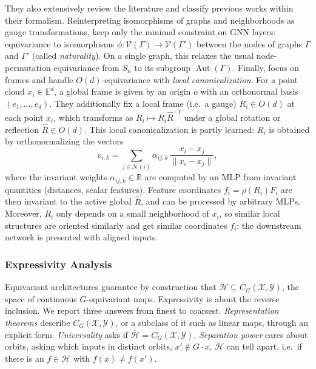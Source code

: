 \documentclass[mathematics,review,submit,moreauthors]{Definitions/mdpi}
\begin{document}
They also extensively review the literature and classify previous works within their formalism.
Reinterpreting isomorphisms of graphs and neighborhoods as gauge transformations, \citet{dehaan2020} keep only the minimal constraint on GNN layers: equivariance to isomorphisms $\phi : \mathcal{V}(\Gamma) \to \mathcal{V}(\Gamma')$ between the nodes of graphs $\Gamma$ and $\Gamma'$ (called \emph{naturality}).
On a single graph, this relaxes the usual node-permutation equivariance from $S_n$ to its subgroup $\operatorname{Aut}(\Gamma)$.
Finally, \citet{lippmann2025iclr} focus on frames and handle $O(d)$-equivariance with \emph{local canonicalization}.
For a point cloud $x_i \in \mathbb E^d$, a global frame is given by an origin $o$ with an orthonormal basis $(e_1, \dots, e_d)$.
They additionally fix a local frame (i.e.\ a gauge) $R_i\in O(d)$ at each point $x_i$, which transforms as $R_i\mapsto R_i\hat R^{-1}$ under a global rotation or reflection $\hat R \in O(d)$.
This local canonicalization is partly learned: $R_i$ is obtained by orthonormalizing the vectors
\[
    v_{i,k} = \sum_{j \in \mathcal{N}(i)} \alpha_{ij,k} \, \frac{x_i - x_j}{\lVert x_i - x_j\rVert},
\]
where the invariant weights $\alpha_{ij,k} \in \mathbb R$ are computed by an MLP from invariant quantities (distances, scalar features).
Feature coordinates $f_i = \rho(R_i)F_i$ are then invariant to the active global $\hat R$, and can be processed by arbitrary MLPs.
Moreover, $R_i$ only depends on a small neighborhood of $x_i$, so similar local structures are oriented similarly and get similar coordinates $f_i$: the downstream network is presented with aligned inputs.

\subsubsection{Expressivity Analysis}
Equivariant architectures guarantee by construction that $\mathcal{H}\subseteq C_G(\mathcal{X},\mathcal{Y})$, the space of continuous $G$-equivariant maps.
Expressivity is about the reverse inclusion.
We report three answers from finest to coarsest.
\emph{Representation theorems} describe $C_G(\mathcal{X},\mathcal{Y})$, or a subclass of it such as linear maps, through an explicit form.
\emph{Universality} asks if $\overline{\mathcal{H}}=C_G(\mathcal{X},\mathcal{Y})$.
\emph{Separation power} cares about orbits, asking which inputs in distinct orbits, $x'\notin G\cdot x$, $\mathcal H$ can tell apart, i.e.\ if there is an $f \in\mathcal H$ with $f(x)\neq f(x')$.
\end{document}
